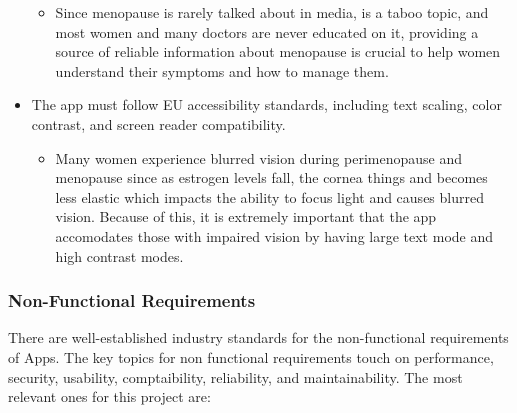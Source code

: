 \begin{itemize}
        \begin{itemize}
          \item Since menopause is rarely talked about in media, is a taboo topic, and most women and many doctors are never educated on it, providing a source of reliable information about menopause is crucial to help women understand their symptoms and how to manage them\cite{Aljumah2023}\cite{MenopauseSupport2021}\cite{Muir2022}.
        \end{itemize}
      \item The app must follow EU accessibility standards, including text scaling, color contrast, and screen reader compatibility.
        \begin{itemize}
          \item  Many women experience blurred vision during perimenopause and menopause since as estrogen levels fall, the cornea things and becomes less elastic which impacts the ability to focus light and causes blurred vision. Because of this, it is extremely important that the app accomodates those with impaired vision by having large text mode and high contrast modes\cite{KellyDonel2023}.
        \end{itemize}      
\end{itemize}

\subsubsection{Non-Functional Requirements}
There are well-established industry standards for the non-functional requirements of Apps\cite{Apple2025}\cite{Tundwal2025}. The key topics for non functional requirements touch on performance, security, usability, comptaibility, reliability, and maintainability. The most relevant ones for this project are:

